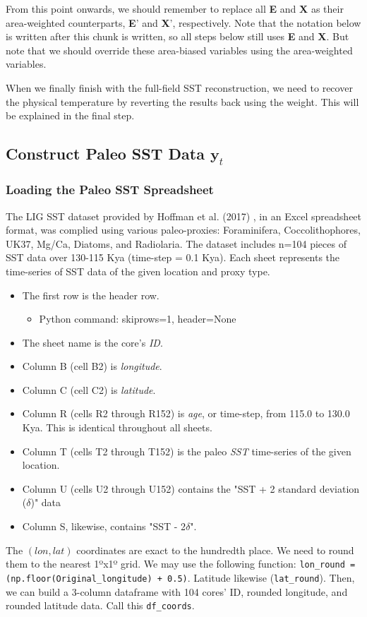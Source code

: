 \documentclass{article}
\begin{document}
From this point onwards, we should remember to replace all \textbf{E} and \textbf{X} as their area-weighted counterparts, \textbf{E}' and \textbf{X}', respectively.
Note that the notation below is written after this chunk is written, so all steps below still uses \textbf{E} and \textbf{X}.
But note that we should override these area-biased variables using the area-weighted variables.

When we finally finish with the full-field SST reconstruction, we need to recover the physical temperature by reverting the results back using the weight.
This will be explained in the final step.


\subsection{Construct Paleo SST Data $\textbf{y}_t$}

\subsubsection{Loading the Paleo SST Spreadsheet}

The LIG SST dataset provided by Hoffman et al. (2017) \cite{Hoffman2017}, in an Excel spreadsheet format, was complied using various paleo-proxies: Foraminifera, Coccolithophores, UK37, Mg/Ca, Diatoms, and Radiolaria. The dataset includes n=104 pieces of SST data over 130-115 Kya (time-step = 0.1 Kya).
Each sheet represents the time-series of SST data of the given location and proxy type.
\begin{itemize}
    \item The first row is the header row.
    \begin{itemize}
        \item Python command: skiprows=1, header=None
    \end{itemize}
    \item The sheet name is the core's \textit{ID}.
    \item Column B (cell B2) is \textit{longitude}.
    \item Column C (cell C2) is \textit{latitude}.
    \item Column R (cells R2 through R152) is \textit{age}, or time-step, from 115.0 to 130.0 Kya. This is identical throughout all sheets.
    \item Column T (cells T2 through T152) is the paleo \textit{SST} time-series of the given location.
    \item Column U (cells U2 through U152) contains the "SST + 2 standard deviation ($\delta$)" data
    \item Column S, likewise, contains "SST - 2$\delta$".
\end{itemize}
The $(lon,lat)$ coordinates are exact to the hundredth place. We need to round them to the nearest 1ºx1º grid.
We may use the following function:
\texttt{lon\_round = (np.floor(Original\_longitude) + 0.5)}. 
Latitude likewise (\texttt{lat\_round}).
Then, we can build a 3-column dataframe with 104 cores' ID, rounded longitude, and rounded latitude data. Call this \texttt{df\_coords}.
\end{document}
